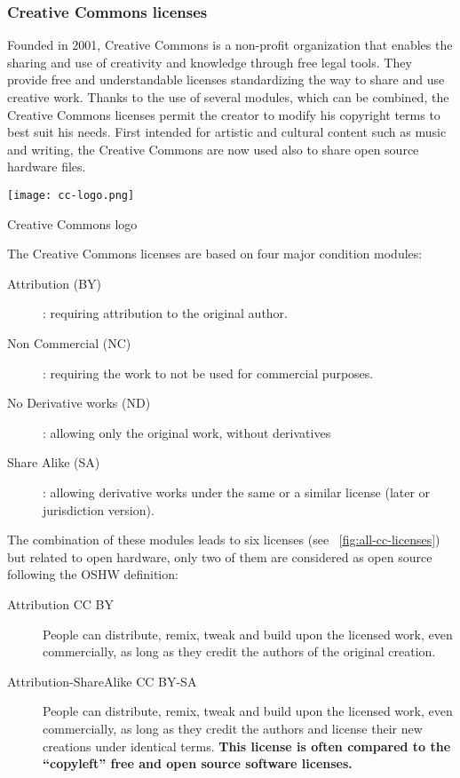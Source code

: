 \subsubsection{Creative Commons licenses} %
\begin{row}{4}{2}
    \begin{cell}{3}
        Founded in 2001, Creative Commons is a non-profit organization that enables the sharing and use of creativity and knowledge through free legal tools. They provide free and understandable licenses standardizing the way to share and use creative work. Thanks to the use of several modules, which can be combined, the Creative Commons licenses permit the creator to modify his copyright terms to best suit his needs. First intended for artistic and cultural content such as music and writing, the Creative Commons are now used also to share open source hardware files.
    \end{cell}
    \begin{cell}{1}
        \begin{NFfigure}
            \centering
                \texttt{[image: cc-logo.png]}
            \caption{Creative Commons logo}
            \label{fig:cc_logo}
        \end{NFfigure}
    \end{cell}
\end{row}
The Creative Commons licenses are based on four major condition modules:
\begin{description}
    \item[Attribution (BY)]: requiring attribution to the original author.
    \item[Non Commercial (NC)]: requiring the work to not be used for commercial purposes.
    \item[No Derivative works (ND)]: allowing only the original work, without derivatives
    \item[Share Alike (SA)]: allowing derivative works under the same or a similar license (later or jurisdiction version).
\end{description}


The combination of these modules leads to six licenses (see \figurename~\ref{fig:all-cc-licenses}) but related to open hardware, only two of them are considered as open source following the OSHW definition:
\begin{description}
    \item[Attribution CC BY] People can distribute, remix, tweak and build upon the licensed work, even commercially, as long as they credit the authors of the original creation.
    \item[Attribution-ShareAlike CC BY-SA] People can distribute, remix, tweak and build upon the licensed work, even commercially, as long as they credit the authors and license their new creations under identical terms. \textbf{This license is often compared to the “copyleft” free and open source software licenses.}
\end{description}

